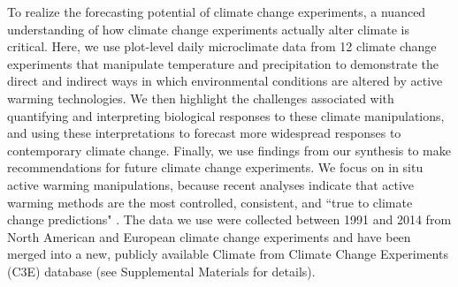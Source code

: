 \documentclass{article}
\begin{document}
\par To realize the forecasting potential of climate change experiments, a nuanced understanding of how climate change experiments actually alter climate is critical. Here, we use  plot-level daily  microclimate  data  from  12 climate  change  experiments  that  manipulate temperature and precipitation to demonstrate the direct and indirect ways in which environmental conditions are altered  by active  warming technologies. We then highlight the challenges associated with quantifying and interpreting biological responses to these climate manipulations, and using these interpretations to forecast  more widespread responses to contemporary climate change. Finally,  we use findings from our synthesis to make recommendations for future  climate  change experiments.  We focus on in situ active warming  manipulations, because recent analyses indicate that active warming methods are the most controlled, consistent, and ``true to climate change predictions" \citep{kimball2005,kimball2008,aronson2009,wolkovich2012}. The data we use were collected between 1991 and 2014 from North American and European climate change experiments and  have been merged into a new, publicly  available  Climate from Climate Change Experiments (C3E) database (see Supplemental Materials  for details). 

\end{document}
